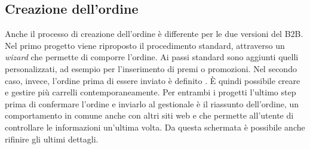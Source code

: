 \subsection{Creazione dell'ordine}
Anche il processo di creazione dell'ordine è differente per le due versioni del B2B. Nel primo progetto viene riproposto il procedimento standard, attraverso un \textit{wizard} che permette di comporre l'ordine. Ai passi standard sono aggiunti quelli personalizzati, ad esempio per l'inserimento di premi o promozioni. Nel secondo caso, invece, l'ordine prima di essere inviato è definito . È quindi possibile creare e gestire più carrelli contemporaneamente. Per entrambi i progetti l'ultimo step prima di confermare l'ordine e inviarlo al gestionale è il riassunto dell'ordine, un comportamento in comune anche con altri siti web e che permette all'utente di controllare le informazioni un'ultima volta. Da questa schermata è possibile anche rifinire gli ultimi dettagli.

